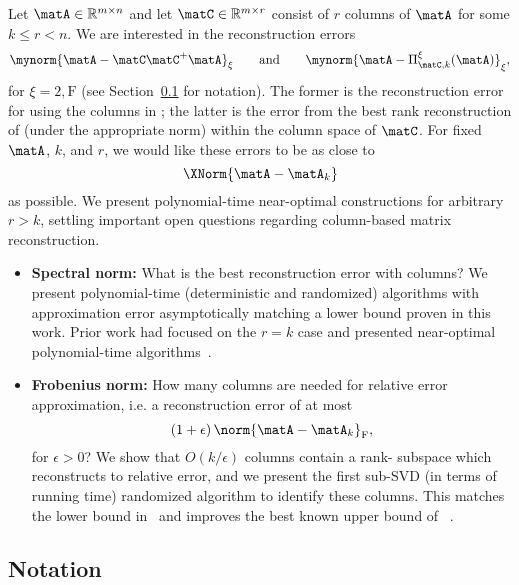 Let $\matA \in \mathbb{R}^{m \times n}$ and let $\matC \in \mathbb{R}^{m \times r}$ consist of $r$ columns of $\matA$ for some $k \leq r < n$.
We are interested in the reconstruction errors
$$
\mynorm{\matA-\matC\matC^+\matA}_{\xi} \qquad \mbox{and} \qquad
\mynorm{\matA-\Pi^\xi_{\matC,k}(\matA)}_{\xi},
$$
for $\xi=2,\mathrm{F}$ (see Section~\ref{sxn:notation} for notation).
The former is the reconstruction error
for \math{\matA} using the columns in \math{\matC};
the latter is the error from the
best  rank 
reconstruction of
\math{\matA} (under the appropriate norm) within the column space of $\matC$.
For fixed $\matA$, $k$, and $r$, we would like these errors to be as close
to $$\XNorm{\matA-\matA_k}$$ as possible.
We present polynomial-time near-optimal constructions for arbitrary
$r>k$,
settling important open questions regarding column-based matrix reconstruction.
\begin{itemize}
\item {\bf Spectral norm:}
What is the best reconstruction error with
 columns? We present polynomial-time (deterministic and
randomized) algorithms with approximation error asymptotically matching a lower
bound proven in this work. Prior work had focused on the $r=k$ case and presented near-optimal polynomial-time algorithms~\cite{ DR10,GE96}.
\item{\bf Frobenius norm:} How many columns are needed for relative error
approximation, i.e. a reconstruction error of at most
$$\left(1+\epsilon \right)\norm{\matA-\matA_k}_{\mathrm{F}},$$
for $\epsilon>0$? We show that
$O(k/\epsilon)$
columns contain a rank- subspace which
reconstructs \math{\matA} to relative error,
and we present the first  sub-SVD (in terms of running time) randomized algorithm to identify these columns. This matches
the  lower bound in~\cite{DV06} and improves the
best known upper bound of ~\cite{DR10,DV06,DMM06b,Sar06}.
\end{itemize}

\subsection{Notation}\label{sxn:notation}

